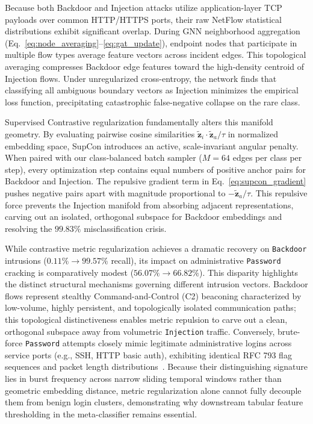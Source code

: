 \documentclass[journal,onecolumn]{IEEEtran}
\begin{document}
Because both Backdoor and Injection attacks utilize application-layer TCP payloads over common HTTP/HTTPS ports, their raw NetFlow statistical distributions exhibit significant overlap. During GNN neighborhood aggregation (Eq.~\ref{eq:node_averaging}--\ref{eq:gat_update}), endpoint nodes that participate in multiple flow types average feature vectors across incident edges. This topological averaging compresses Backdoor edge features toward the high-density centroid of Injection flows. Under unregularized cross-entropy, the network finds that classifying all ambiguous boundary vectors as Injection minimizes the empirical loss function, precipitating catastrophic false-negative collapse on the rare class.

Supervised Contrastive regularization fundamentally alters this manifold geometry. By evaluating pairwise cosine similarities $\tilde{\boldsymbol{z}}_i \cdot \tilde{\boldsymbol{z}}_a / \tau$ in normalized embedding space, SupCon introduces an active, scale-invariant angular penalty. When paired with our class-balanced batch sampler ($M = 64$ edges per class per step), every optimization step contains equal numbers of positive anchor pairs for Backdoor and Injection. The repulsive gradient term in Eq.~\ref{eq:supcon_gradient} pushes negative pairs apart with magnitude proportional to $- \tilde{\boldsymbol{z}}_a / \tau$. This repulsive force prevents the Injection manifold from absorbing adjacent representations, carving out an isolated, orthogonal subspace for Backdoor embeddings and resolving the $99.83\%$ misclassification crisis.

While contrastive metric regularization achieves a dramatic recovery on \texttt{Backdoor} intrusions ($0.11\% \to 99.57\%$ recall), its impact on administrative \texttt{Password} cracking is comparatively modest ($56.07\% \to 66.82\%$). This disparity highlights the distinct structural mechanisms governing different intrusion vectors. Backdoor flows represent stealthy Command-and-Control (C2) beaconing characterized by low-volume, highly persistent, and topologically isolated communication paths; this topological distinctiveness enables metric repulsion to carve out a clean, orthogonal subspace away from volumetric \texttt{Injection} traffic. Conversely, brute-force \texttt{Password} attempts closely mimic legitimate administrative logins across service ports (e.g., SSH, HTTP basic auth), exhibiting identical RFC 793 flag sequences and packet length distributions~\cite{sarhan2021netflow}. Because their distinguishing signature lies in burst frequency across narrow sliding temporal windows rather than geometric embedding distance, metric regularization alone cannot fully decouple them from benign login clusters, demonstrating why downstream tabular feature thresholding in the meta-classifier remains essential.
\end{document}
